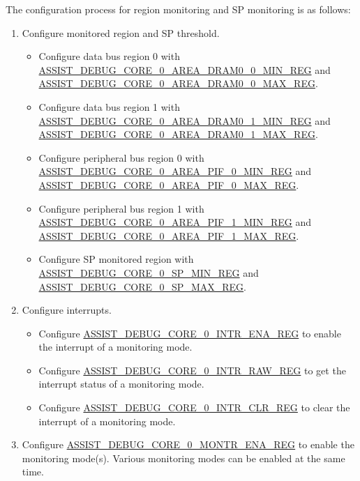 \documentclass[main\_\_EN.tex]{subfiles}
\begin{document}
The configuration process for region monitoring and SP monitoring is as follows:

\begin{enumerate}
    \item Configure monitored region and SP threshold.
        \begin{itemize}
            \item Configure data bus region 0 with \hyperref[regdesc:ASSISTDEBUGCORE0AREADRAM00MINREG]{ASSIST\_DEBUG\_CORE\_0\_AREA\_DRAM0\_0\_MIN\_REG} and\\ \hyperref[regdesc:ASSISTDEBUGCORE0AREADRAM00MAXREG]{ASSIST\_DEBUG\_CORE\_0\_AREA\_DRAM0\_0\_MAX\_REG}. 
            \item Configure data bus region 1 with \hyperref[regdesc:ASSISTDEBUGCORE0AREADRAM01MINREG]{ASSIST\_DEBUG\_CORE\_0\_AREA\_DRAM0\_1\_MIN\_REG} and\\ \hyperref[regdesc:ASSISTDEBUGCORE0AREADRAM01MAXREG]{ASSIST\_DEBUG\_CORE\_0\_AREA\_DRAM0\_1\_MAX\_REG}.
            \item Configure peripheral bus region 0 with \hyperref[regdesc:ASSISTDEBUGCORE0AREAPIF0MINREG]{ASSIST\_DEBUG\_CORE\_0\_AREA\_PIF\_0\_MIN\_REG} and\\ \hyperref[regdesc:ASSISTDEBUGCORE0AREAPIF0MAXREG]{ASSIST\_DEBUG\_CORE\_0\_AREA\_PIF\_0\_MAX\_REG}.
            \item Configure peripheral bus region 1 with \hyperref[regdesc:ASSISTDEBUGCORE0AREAPIF1MINREG]{ASSIST\_DEBUG\_CORE\_0\_AREA\_PIF\_1\_MIN\_REG} and\\ \hyperref[regdesc:ASSISTDEBUGCORE0AREAPIF1MAXREG]{ASSIST\_DEBUG\_CORE\_0\_AREA\_PIF\_1\_MAX\_REG}.
            \item Configure SP monitored region with \hyperref[regdesc:ASSISTDEBUGCORE0SPMINREG]{ASSIST\_DEBUG\_CORE\_0\_SP\_MIN\_REG} and\\ \hyperref[regdesc:ASSISTDEBUGCORE0SPMAXREG]{ASSIST\_DEBUG\_CORE\_0\_SP\_MAX\_REG}.
        \end{itemize}
    
    \item Configure interrupts.
    \begin{itemize}
        \item Configure \hyperref[regdesc:ASSISTDEBUGCORE0INTRENAREG]{ASSIST\_DEBUG\_CORE\_0\_INTR\_ENA\_REG} to enable the interrupt of a monitoring mode. 
        \item Configure \hyperref[regdesc:ASSISTDEBUGCORE0INTRRAWREG]{ASSIST\_DEBUG\_CORE\_0\_INTR\_RAW\_REG} to get the interrupt status of a monitoring mode. 
        \item Configure \hyperref[regdesc:ASSISTDEBUGCORE0INTRCLRREG]{ASSIST\_DEBUG\_CORE\_0\_INTR\_CLR\_REG} to clear the interrupt of a monitoring mode.
    \end{itemize}
    \item Configure \hyperref[regdesc:ASSISTDEBUGCORE0MONTRENAREG]{ASSIST\_DEBUG\_CORE\_0\_MONTR\_ENA\_REG} to enable the monitoring mode(s). Various monitoring modes can be enabled at the same time.
\end{enumerate}
\end{document}
